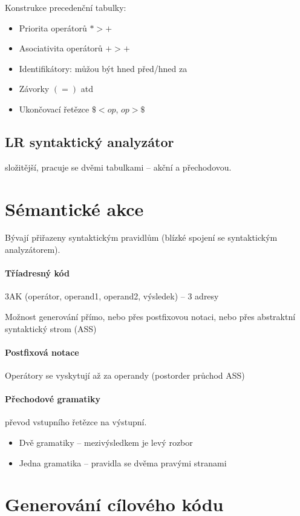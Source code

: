 \documentclass[a4wide]{report}
\begin{document}
Konstrukce precedenční tabulky:
\begin{itemize}
	\item Priorita operátorů $ * > +$
	\item Asociativita operátorů $ + > + $
	\item Identifikátory: můžou být hned před/hned za
	\item Závorky $ ( = ) $ atd
	\item Ukončovací řetězce $\$ < op$, $ op > \$$
\end{itemize}

\subsection{LR syntaktický analyzátor}

složitější, pracuje se dvěmi tabulkami -- akční a přechodovou.

\section{Sémantické akce}

Bývají přiřazeny syntaktickým pravidlům (blízké spojení se syntaktickým analyzátorem).


\paragraph{Tříadresný kód}
3AK (operátor, operand1, operand2, výsledek) -- 3 adresy

Možnost generování přímo, nebo přes postfixovou notaci, nebo přes abstraktní syntaktický strom (ASS)

\paragraph{Postfixová notace}
Operátory se vyskytují až za operandy (postorder průchod ASS)

\paragraph{Přechodové gramatiky} převod vstupního řetězce na výstupní.
\begin{itemize}
	\item Dvě gramatiky -- mezivýsledkem je levý rozbor
	\item Jedna gramatika -- pravidla se dvěma pravými stranami
\end{itemize}

\section{Generování cílového kódu}
\end{document}
